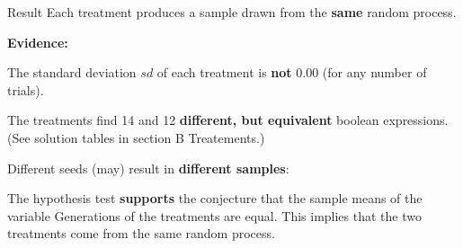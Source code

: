 \begin{frame}
\vspace*{2mm}
\begin{block}{
Result
}
Each treatment produces a sample drawn from the {\bf same} random process.
 
{\bf Evidence:}
 
The standard deviation $sd$ of each treatment is {\bf not} $0.00$
(for any number of trials).
 
The treatments find 14 and 12 {\bf different, but equivalent} boolean expressions.
(See solution tables in section B Treatements.)
 
Different seeds (may) result in {\bf different samples}:
 
The hypothesis test {\bf supports} the conjecture
that the sample means of the variable Generations of the treatments are equal.
This implies that the two treatments come from the same random process.
\end{block}
\end{frame}